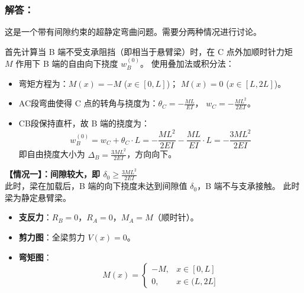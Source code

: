 \documentclass[11pt,a4paper]{ctexrep}
\begin{document}
{

\flushleft

\subsubsection*{解答：}

这是一个带有间隙约束的超静定弯曲问题。需要分两种情况进行讨论。

首先计算当 B 端不受支承阻挡（即相当于悬臂梁）时，在 C 点外加顺时针力矩 $M$ 作用下 B 端的自由向下挠度 $w_B^{(0)}$。
使用叠加法或积分法：
\begin{itemize}
    \item 弯矩方程为：$M(x) = -M$ ($x \in [0, L]$)； $M(x) = 0$ ($x \in [L, 2L]$)。
    \item AC段弯曲使得 C 点的转角与挠度为：$\theta_C = -\frac{ML}{EI}$， $w_C = -\frac{ML^2}{2EI}$。
    \item CB段保持直杆，故 B 端的挠度为：
          \[
              w_B^{(0)} = w_C + \theta_C \cdot L = -\frac{ML^2}{2EI} - \frac{ML}{EI} \cdot L = -\frac{3ML^2}{2EI}
          \]
          即自由挠度大小为 $\Delta_B = \frac{3ML^2}{2EI}$，方向向下。
\end{itemize}

\textbf{【情况一】：间隙较大，即 $\delta_0 \ge \frac{3ML^2}{2EI}$} \\
此时，梁在加载后，B 端的向下挠度未达到间隙值 $\delta_0$，B 端不与支承接触。
此时梁为静定悬臂梁。
\begin{itemize}
    \item \textbf{支反力}：$R_B = 0$，$R_A = 0$，$M_A = M$（顺时针）。
    \item \textbf{剪力图}：全梁剪力 $V(x) = 0$。
    \item \textbf{弯矩图}：
          \[
              M(x) = \begin{cases} -M, & x \in [0, L] \\ 0, & x \in (L, 2L] \end{cases}
          \]
\end{itemize}

\begin{center}
\end{center}

}
\end{document}
